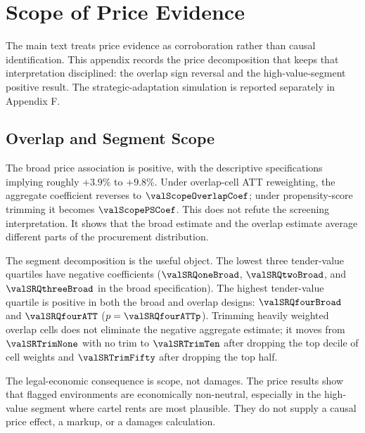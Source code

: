 \section{Scope of Price Evidence}
\label{app:scope_adaptation_submission}

The main text treats price evidence as corroboration rather
than causal identification. This appendix records the price
decomposition that keeps that interpretation disciplined: the
overlap sign reversal and the high-value-segment positive
result. The strategic-adaptation simulation is reported
separately in Appendix F.

\subsection{Overlap and Segment Scope}
\label{app:overlap_scope_submission}

The broad price association is positive, with the descriptive
specifications implying roughly $+3.9\%$ to $+9.8\%$. Under overlap-cell ATT reweighting, the
aggregate coefficient reverses to $\valScopeOverlapCoef$; under
propensity-score trimming it becomes $\valScopePSCoef$. This
does not refute the screening interpretation. It shows that the
broad estimate and the overlap estimate average different parts
of the procurement distribution.

The segment decomposition is the useful object. The lowest three
tender-value quartiles have negative coefficients
($\valSRQoneBroad$, $\valSRQtwoBroad$, and
$\valSRQthreeBroad$ in the broad specification). The highest
tender-value quartile is positive in both the broad and overlap
designs: $\valSRQfourBroad$ and $\valSRQfourATT$
($p=\valSRQfourATTp$). Trimming heavily weighted overlap cells
does not eliminate the negative aggregate estimate; it moves from
$\valSRTrimNone$ with no trim to $\valSRTrimTen$ after dropping
the top decile of cell weights and $\valSRTrimFifty$ after
dropping the top half.

The legal-economic consequence is scope, not damages. The price
results show that flagged environments are economically
non-neutral, especially in the high-value segment where cartel
rents are most plausible. They do not supply a causal price
effect, a markup, or a damages calculation.
